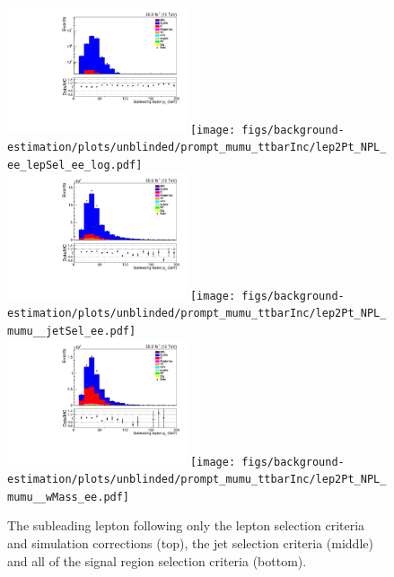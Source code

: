 \begin{figure}[h]
\centering
\includegraphics[width=0.47\textwidth]{figs/background-estimation/plots/unblinded/prompt_ee_ttbarInc/lep2Pt_NPL_ee_lepSel_ee_log.pdf}
\texttt{[image: figs/background-estimation/plots/unblinded/prompt\_mumu\_ttbarInc/lep2Pt\_NPL\_ee\_lepSel\_ee\_log.pdf]}
\\
\includegraphics[width=0.47\textwidth]{figs/background-estimation/plots/unblinded/prompt_ee_ttbarInc/lep2Pt_NPL_ee_jetSel_ee.pdf}
\texttt{[image: figs/background-estimation/plots/unblinded/prompt\_mumu\_ttbarInc/lep2Pt\_NPL\_mumu\_\_jetSel\_ee.pdf]}
\\
\includegraphics[width=0.47\textwidth]{figs/background-estimation/plots/unblinded/prompt_ee_ttbarInc/lep2Pt_NPL_ee_wMass_ee.pdf}
\texttt{[image: figs/background-estimation/plots/unblinded/prompt\_mumu\_ttbarInc/lep2Pt\_NPL\_mumu\_\_wMass\_ee.pdf]}
\caption{
The subleading lepton \pT following only the lepton selection criteria and simulation corrections (top), the jet selection criteria (middle) and all of the signal region selection criteria (bottom).
}
\label{fig:SR_lep2Pt}
\end{figure}

